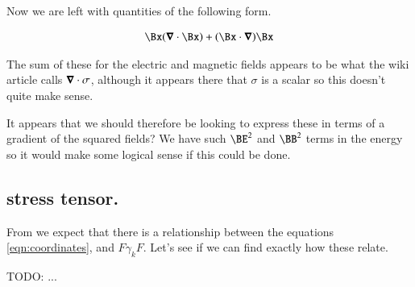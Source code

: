 \documentclass{article}
\begin{document}
Now we are left with quantities of the following form.

\begin{align*}
\Bx (\spacegrad \cdot \Bx) +(\Bx \cdot \spacegrad) \Bx 
\end{align*}

The sum of these for the electric and magnetic fields appears to be what the 
wiki article calls $\boldsymbol{\nabla} \cdot \sigma$, although it appears
there that $\sigma$ is a scalar so this doesn't quite make sense.

It appears that 
we should therefore be looking to
express these in terms of a gradient of the squared fields?  We have such $\BE^2$ and $\BB^2$ terms in the energy so it would make some logical sense if this
could be done.

\subsection{ stress tensor. }

From \cite{doran2003gap} we expect that there is a relationship between
the equations \ref{eqn:coordinates}, and $F \gamma_k F$.  Let's see 
if we can find exactly how these relate.



TODO: ...



\end{document}
